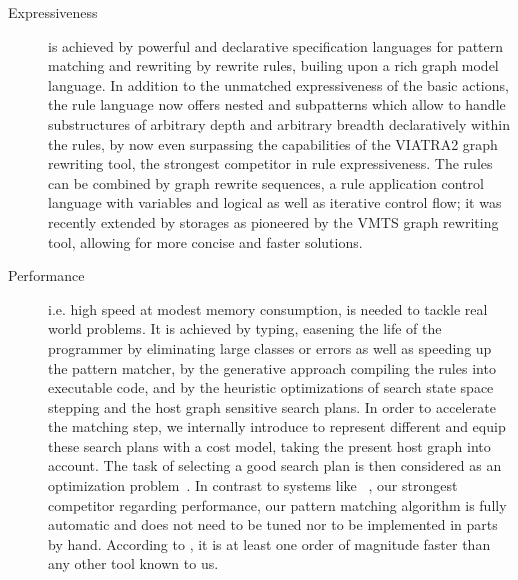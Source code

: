 \begin{description}

\item[Expressiveness]
is achieved by powerful and declarative specification languages for pattern matching and rewriting by rewrite rules, builing upon a rich graph model language.
In addition to the unmatched expressiveness of the basic actions,
the rule language now offers nested and subpatterns which allow to handle substructures of arbitrary depth and arbitrary breadth declaratively within the rules,
by now even surpassing the capabilities of the VIATRA2\cite{viatra2,recursiveviatra} graph rewriting tool, the strongest competitor in rule expressiveness. 
The rules can be combined by graph rewrite sequences, a rule application control language with variables and logical as well as iterative control flow;
it was recently extended by storages as pioneered by the VMTS\cite{vmts} graph rewriting tool, allowing for more concise and faster solutions.

\item[Performance]
i.e. high speed at modest memory consumption, is needed to tackle real world problems.
It is achieved by typing, easening the life of the programmer by eliminating large classes or errors as well as speeding up the pattern matcher,
by the generative approach compiling the rules into executable code, 
and by the heuristic optimizations of search state space stepping and the host graph sensitive search plans.
In order to accelerate the matching step, we internally introduce  
to represent different  and equip these search plans with a cost model, taking the present host graph into account.
The task of selecting a good search plan is then considered as an optimization problem~\cite{BKG:07,Bat:06}.
In contrast to systems like ~\cite{fujaba,fuj}, our strongest competitor regarding performance, 
our pattern matching algorithm is fully automatic and does not need to be tuned nor to be implemented in parts by hand.
According to \cite{varro_bench}, it is at least one order of magnitude faster than any other tool known to us.


\end{description}
